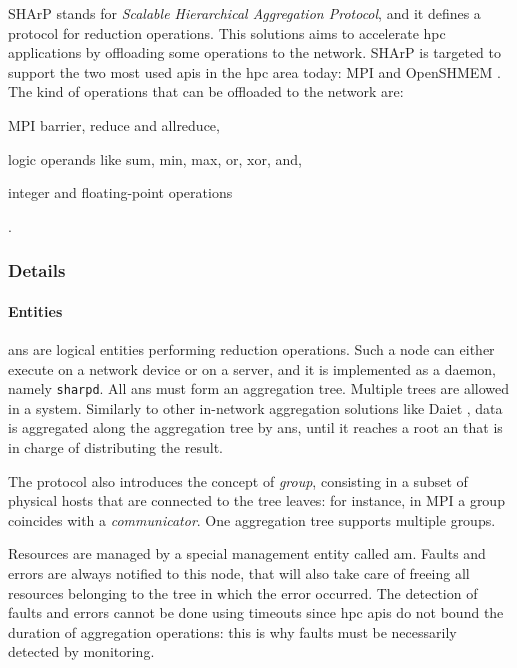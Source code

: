 SHArP \cite{sharp} stands for \textit{Scalable Hierarchical Aggregation Protocol}, and it defines a protocol for reduction operations.
This solutions aims to accelerate \gls{hpc} applications by offloading some operations to the network. SHArP \cite{sharp} is targeted to support the two most used \glspl{api} in the \gls{hpc} area today: MPI \cite{mpi} and OpenSHMEM \cite{openshmem}.
The kind of operations that can be offloaded to the network are:
\begin{mylist}
    \item MPI \cite{mpi} barrier, reduce and allreduce,
    \item logic operands like sum, min, max, or, xor, and,
    \item integer and floating-point operations
\end{mylist}.

\subsubsection{Details}
\paragraph{Entities}
\glspl{an} are logical entities performing reduction operations.
Such a node can either execute on a network device or on a server, and it is implemented as a daemon, namely \texttt{sharpd}.
All \glspl{an} must form an aggregation tree.
Multiple trees are allowed in a system.
Similarly to other in-network aggregation solutions like Daiet \cite{daiet}, data is aggregated along the aggregation tree by \glspl{an}, until it reaches a root \gls{an} that is in charge of distributing the result.

The protocol also introduces the concept of \textit{group}, consisting in a subset of physical hosts that are connected to the tree leaves: for instance, in MPI \cite{mpi} a group coincides with a \textit{communicator}.
One aggregation tree supports multiple groups.

Resources are managed by a special management entity called \gls{am}.
Faults and errors are always notified to this node, that will also take care of freeing all resources belonging to the tree in which the error occurred.
The detection of faults and errors cannot be done using timeouts since \gls{hpc} \glspl{api} do not bound the duration of aggregation operations: this is why faults must be necessarily detected by monitoring.

